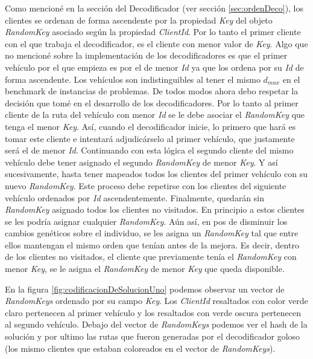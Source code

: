 Como mencioné en la sección del Decodificador (ver sección \ref{sec:ordenDeco}), los clientes se ordenan de forma ascendente por la propiedad \textit{Key} del objeto \textit{RandomKey} asociado según la propiedad \textit{ClientId}. Por lo tanto el primer cliente con el que trabaja el decodificador, es el cliente con menor valor de \textit{Key}. Algo que no mencioné sobre la implementación de los decodificadores es que el primer vehículo por el que empieza es por el de menor \textit{Id} ya que los ordena por su \textit{Id} de forma ascendente. Los vehículos son indistinguibles al tener el mismo $d_{max}$ en el benchmark de instancias de problemas. De todos modos ahora debo respetar la decisión que tomé en el desarrollo de los decodificadores. Por lo tanto al primer cliente de la ruta del vehículo con menor \textit{Id} se le debe asociar el \textit{RandomKey} que tenga el menor \textit{Key}. Así, cuando el decodificador inicie, lo primero que hará es tomar este cliente e intentará adjudicárselo al primer vehículo, que justamente será el de menor \textit{Id}. Continuando con esta lógica el segundo cliente del mismo vehículo debe tener asignado el segundo \textit{RandomKey} de menor \textit{Key}. Y así sucesivamente, hasta tener mapeados todos los clientes del primer vehículo con su nuevo \textit{RandomKey}. Este proceso debe repetirse con los clientes del siguiente vehículo ordenados por \textit{Id} ascendentemente. Finalmente, quedarán sin \textit{RandomKey} asignado todos los clientes no visitados. En principio a estos clientes se les podría asignar cualquier \textit{RandomKey}. Aún así, en pos de disminuir los cambios genéticos sobre el individuo, se les asigna un \textit{RandomKey} tal que entre ellos mantengan el mismo orden que tenían antes de la mejora. Es decir, dentro de los clientes no visitados, el cliente que previamente tenía el \textit{RandomKey} con menor \textit{Key}, se le asigna el \textit{RandomKey} de menor \textit{Key} que queda disponible. 

\bigskip

En la figura \ref{fig:codificacionDeSolucionUno} podemos observar un vector de \textit{RandomKeys} ordenado por su campo \textit{Key}. Los \textit{ClientId} resaltados con color verde claro pertenecen al primer vehículo y los resaltados con verde oscura pertenecen al segundo vehículo. Debajo del vector de \textit{RandomKeys} podemos ver el hash de la solución y por ultimo las rutas que fueron generadas por el decodificador goloso (los mismo clientes que estaban coloreados en el vector de \textit{RandomKeys}).

